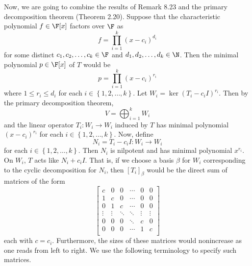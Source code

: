 \documentclass[linearalgebra]{subfiles}
\begin{document}
    \begin{remark}
        Now, we are going to combine the results of Remark 8.23 and the primary decomposition theorem (Theorem 2.20). Suppose that the characteristic polynomial $f\in\F[x]$ factors over $\F$ as
        \begin{equation*}
            f = \prod^{k}_{i=1} \left( x-c_i \right) ^{d_i}
        \end{equation*}
        for some distinct $c_1,c_2,\ldots,c_k\in\F$ and $d_1,d_2,\ldots,d_k\in\N$. Then the minimal polynomial $p\in\F[x]$ of $T$ would be
        \begin{equation*}
            p = \prod^{k}_{i=1} \left( x-c_i \right) ^{r_i}
        \end{equation*}
        where $1\leq r_i\leq d_i$ for each $i\in\left\lbrace 1,2,\ldots,k \right\rbrace$. Let $W_i = \ker\left( T_i-c_iI \right)^{r_i}$. Then by the primary decomposition theorem,
        \begin{equation*}
            V = \bigoplus^{k}_{i=1} W_i
        \end{equation*}
        and the linear operator $T_i:W_i\to W_i$ induced by $T$ has minimal polynomial $\left( x-c_i \right) ^{r_i}$ for each $i\in\left\lbrace 1,2,\ldots,k \right\rbrace $. Now, define
        \begin{equation*}
            N_i = T_i-c_iI: W_i\to W_i
        \end{equation*}
        for each $i\in\left\lbrace 1,2,\ldots,k \right\rbrace$. Then $N_i$ is nilpotent and has minimal polynomial $x^{r_i}$. On $W_i$, $T$ acts like $N_i+c_iI$. That is, if we choose a basis $\beta$ for $W_i$ corresponding to the cyclic decomposition for $N_i$, then $\left[ T_i \right] _\beta$ would be the direct sum of matrices of the form
        \begin{equation*}
            \begin{bmatrix}
                c & 0 & 0 & \cdots & 0 & 0 \\
                1 & c & 0 & \cdots & 0 & 0 \\
                0 & 1 & c & \cdots & 0 & 0 \\
                \vdots & \vdots & \ddots & \ddots & \vdots & \vdots \\
                0 & 0 & 0 & \ddots & c & 0 \\
                0 & 0 & 0 & \cdots & 1 & c \\
            \end{bmatrix}
        \end{equation*}
        each with $c=c_i$. Furthermore, the sizes of these matrices would nonincrease as one reads from left to right. We use the following terminology to specify such matrices. 
    \end{remark}
\end{document}
